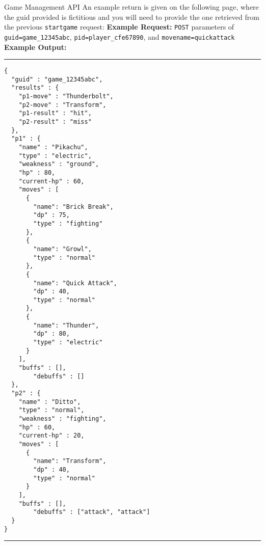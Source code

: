 \documentclass[programming]{../../../../mfcs}
\begin{document}
\begin{question}{Game Management API}
An example return is given on the following page, where the guid provided is fictitious and you will need to provide the one retrieved from the previous \texttt{startgame} request:
\newpage
\textbf{Example Request:}
\newline
\texttt{POST} parameters of \texttt{guid=game\_12345abc}, \texttt{pid=player\_cfe67890}, and
\texttt{movename=quickattack}
\newline
\textbf{Example Output:}
\vspace{1em}
\hrule
\begin{lstlisting}
{
  "guid" : "game_12345abc",
  "results" : {
    "p1-move" : "Thunderbolt",
    "p2-move" : "Transform",
    "p1-result" : "hit",
    "p2-result" : "miss"
  },
  "p1" : {
    "name" : "Pikachu",
    "type" : "electric",
    "weakness" : "ground",
    "hp" : 80,
    "current-hp" : 60,
    "moves" : [
      {
        "name": "Brick Break",
        "dp" : 75,
        "type" : "fighting"
      },
      {
        "name": "Growl",
        "type" : "normal"
      },
      {
        "name": "Quick Attack",
        "dp" : 40,
        "type" : "normal"
      },
      { 
        "name": "Thunder",
        "dp" : 80,
        "type" : "electric"
      }
    ],
    "buffs" : [],
		"debuffs" : []
  },
  "p2" : {
    "name" : "Ditto",
    "type" : "normal",
    "weakness" : "fighting",
    "hp" : 60,
    "current-hp" : 20,
    "moves" : [
      {
        "name": "Transform",
        "dp" : 40,
        "type" : "normal"
      }
    ],
    "buffs" : [],
		"debuffs" : ["attack", "attack"]
  }
}
\end{lstlisting}
\hrule
\end{question}
\end{document}
